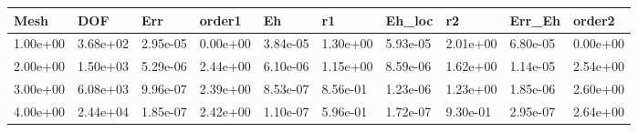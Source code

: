\begin{tabular}{llllllllll}
Mesh & DOF & Err & order1 & Eh & r1 & Eh_loc & r2 & Err_Eh & order2 \\ 
\hline 
1.00e+00 & 3.68e+02 & 2.95e-05 & 0.00e+00 & 3.84e-05 & 1.30e+00 & 5.93e-05 & 2.01e+00 & 6.80e-05 & 0.00e+00 \\ 
2.00e+00 & 1.50e+03 & 5.29e-06 & 2.44e+00 & 6.10e-06 & 1.15e+00 & 8.59e-06 & 1.62e+00 & 1.14e-05 & 2.54e+00 \\ 
3.00e+00 & 6.08e+03 & 9.96e-07 & 2.39e+00 & 8.53e-07 & 8.56e-01 & 1.23e-06 & 1.23e+00 & 1.85e-06 & 2.60e+00 \\ 
4.00e+00 & 2.44e+04 & 1.85e-07 & 2.42e+00 & 1.10e-07 & 5.96e-01 & 1.72e-07 & 9.30e-01 & 2.95e-07 & 2.64e+00 \\ 
\hline 
\end{tabular}